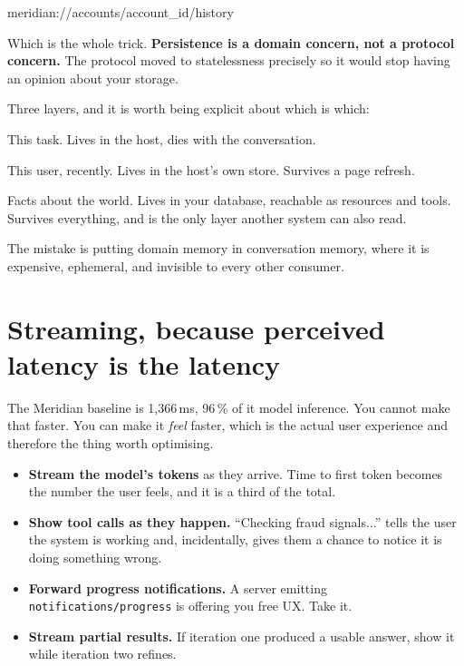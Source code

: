 \begin{plain}
meridian://accounts/{account_id}/history
\end{plain}

Which is the whole trick. \textbf{Persistence is a domain concern, not a
protocol concern.} The protocol moved to statelessness precisely so it would stop
having an opinion about your storage.

Three layers, and it is worth being explicit about which is which:

\begin{description}[leftmargin=1.4em, style=nextline, itemsep=3pt]
\item[Conversation memory] This task. Lives in the host, dies with the
conversation.
\item[Session memory] This user, recently. Lives in the host's own store.
Survives a page refresh.
\item[Domain memory] Facts about the world. Lives in your database, reachable as
resources and tools. Survives everything, and is the only layer another system
can also read.
\end{description}

The mistake is putting domain memory in conversation memory, where it is
expensive, ephemeral, and invisible to every other consumer.

\section{Streaming, because perceived latency is the latency}

The Meridian baseline is 1,366\,ms, 96\,\% of it model inference. You cannot make
that faster. You can make it \emph{feel} faster, which is the actual user experience and
therefore the thing worth optimising.

\begin{itemize}[leftmargin=1.6em, itemsep=3pt]
\item \textbf{Stream the model's tokens} as they arrive. Time to first token
becomes the number the user feels, and it is a third of the total.
\item \textbf{Show tool calls as they happen.} ``Checking fraud signals...''
tells the user the system is working and, incidentally, gives them a chance to
notice it is doing something wrong.
\item \textbf{Forward progress notifications.} A server emitting
\texttt{notifications/progress} is offering you free UX. Take it.
\item \textbf{Stream partial results.} If iteration one produced a usable
answer, show it while iteration two refines.
\end{itemize}

